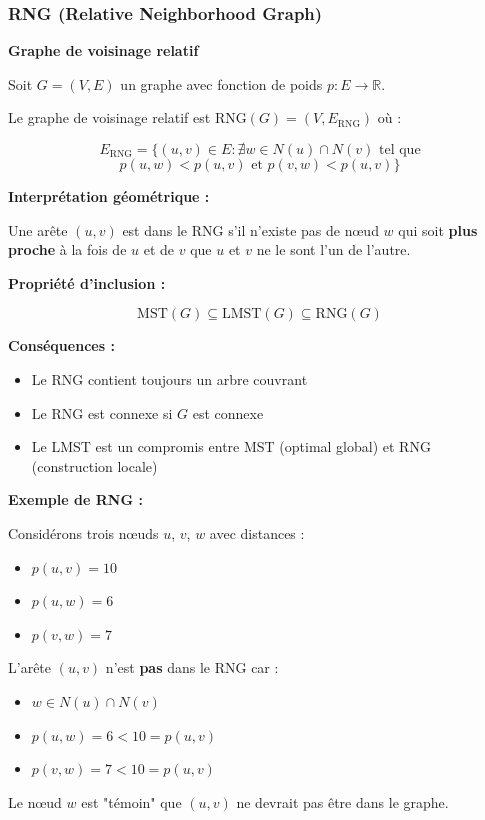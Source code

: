 \documentclass[12pt,a4paper]{article}
\begin{document}
\subsubsection{RNG (Relative Neighborhood Graph)}

\begin{definition}
\textbf{Graphe de voisinage relatif}

Soit $G = (V, E)$ un graphe avec fonction de poids $p : E \to \mathbb{R}$.

Le graphe de voisinage relatif est $\text{RNG}(G) = (V, E_{\text{RNG}})$ où :

$$E_{\text{RNG}} = \{(u, v) \in E : \nexists w \in N(u) \cap N(v) \text{ tel que}$$
$$p(u,w) < p(u, v) \text{ et } p(v,w) < p(u, v)\}$$

\textbf{Interprétation géométrique :}

Une arête $(u,v)$ est dans le RNG s'il n'existe pas de nœud $w$ qui soit \textcolor{titrebleu}{\textbf{plus proche}} à la fois de $u$ et de $v$ que $u$ et $v$ ne le sont l'un de l'autre.
\end{definition}

\begin{important}
\textbf{Propriété d'inclusion :}

$$\text{MST}(G) \subseteq \text{LMST}(G) \subseteq \text{RNG}(G)$$

\textbf{Conséquences :}
\begin{itemize}
    \item Le RNG contient toujours un arbre couvrant
    \item Le RNG est connexe si $G$ est connexe
    \item Le LMST est un compromis entre MST (optimal global) et RNG (construction locale)
\end{itemize}
\end{important}

\begin{exemple}
\textbf{Exemple de RNG :}

Considérons trois nœuds $u$, $v$, $w$ avec distances :
\begin{itemize}
    \item $p(u,v) = 10$
    \item $p(u,w) = 6$
    \item $p(v,w) = 7$
\end{itemize}

L'arête $(u,v)$ n'est \textcolor{importantrouge}{\textbf{pas}} dans le RNG car :
\begin{itemize}
    \item $w \in N(u) \cap N(v)$
    \item $p(u,w) = 6 < 10 = p(u,v)$ \checkmark
    \item $p(v,w) = 7 < 10 = p(u,v)$ \checkmark
\end{itemize}

Le nœud $w$ est "témoin" que $(u,v)$ ne devrait pas être dans le graphe.
\end{exemple}
\end{document}
